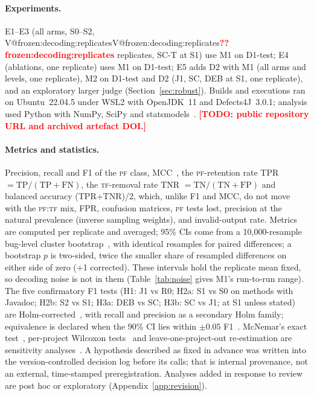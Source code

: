 \documentclass[pdflatex,iicol,sn-mathphys-num]{sn-jnl}
\makeatletter
\newcommand{\V}[1]{\ifcsname V@#1\endcsname\csname V@#1\endcsname\else\textbf{\textcolor{red}{??#1}}\fi}
\newcommand{\TODO}[1]{\textbf{\textcolor{red}{[TODO: #1]}}}
\newcommand{\PF}{\textsc{pf}}
\newcommand{\TF}{\textsc{tf}}
\makeatother
\begin{document}
\paragraph{Experiments.} E1--E3 (all arms, S0--S2, \V{frozen:decoding:replicates} replicates, SC-T at S1) use M1 on D1-test; E4 (ablations, one replicate) uses M1 on D1-test; E5 adds D2 with M1 (all arms and levels, one replicate), M2 on D1-test and D2 (J1, SC, DEB at S1, one replicate), and an exploratory larger judge (Section~\ref{sec:robust}). Builds and executions ran on Ubuntu~22.04.5 under WSL2 with OpenJDK~11 and Defects4J~3.0.1; analysis used Python with NumPy, SciPy and statsmodels~\cite{seabold2010statsmodels}. \TODO{public repository URL and archived artefact DOI.}

\paragraph{Metrics and statistics.} Precision, recall and F1 of the \PF{} class, MCC~\cite{chicco2020mcc}, the \PF{}-retention rate TPR $=\mathrm{TP}/(\mathrm{TP}+\mathrm{FN})$, the \TF{}-removal rate TNR $=\mathrm{TN}/(\mathrm{TN}+\mathrm{FP})$ and balanced accuracy (TPR+TNR)/2, which, unlike F1 and MCC, do not move with the \PF{}:\TF{} mix, FPR, confusion matrices, \PF{} tests lost, precision at the natural prevalence (inverse sampling weights), and invalid-output rate. Metrics are computed per replicate and averaged; 95\% CIs come from a 10{,}000-resample bug-level cluster bootstrap~\cite{efron1993bootstrap}, with identical resamples for paired differences; a bootstrap $p$ is two-sided, twice the smaller share of resampled differences on either side of zero (+1 corrected). These intervals hold the replicate mean fixed, so decoding noise is not in them (Table~\ref{tab:noise} gives M1's run-to-run range). The five confirmatory F1 tests (H1: J1 vs R0; H2a: S1 vs S0 on methods with Javadoc; H2b: S2 vs S1; H3a: DEB vs SC; H3b: SC vs J1; at S1 unless stated) are Holm-corrected~\cite{holm1979}, with recall and precision as a secondary Holm family; equivalence is declared when the 90\% CI lies within $\pm0.05$ F1~\cite{lakens2017equivalence}. McNemar's exact test~\cite{dietterich1998tests}, per-project Wilcoxon tests~\cite{wilcoxon1945} and leave-one-project-out re-estimation are sensitivity analyses~\cite{arcuri2011guide}. A hypothesis described as fixed in advance was written into the version-controlled decision log before its calls; that is internal provenance, not an external, time-stamped preregistration. Analyses added in response to review are post hoc or exploratory (Appendix~\ref{app:revision}).
\end{document}
